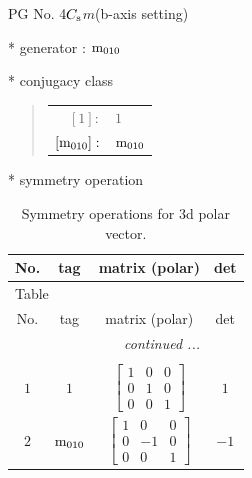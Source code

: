 \documentclass[fleqn,8pt]{jsarticle}
\begin{document}
\setcounter{MaxMatrixCols}{32}

\renewcommand{\tablename}{Table~}
\renewcommand{\figurename}{Figure~}
\begin{center}
\LARGE
PG No. 4\quad$C_{\rm s}$\quad$m$\quad(b-axis setting)\quad[ monoclinic ]
\end{center}

* generator : ${\rm m}_{010}$

* conjugacy class
\begin{quote}
\begin{tabular}{rl}
$ [1]: $ & $ 1 $ \\
$ [{\rm m}_{010}]: $ & $ {\rm m}_{010} $
\end{tabular}
\end{quote}

* symmetry operation
\renewcommand{\arraystretch}{1.3}
\begin{longtable}{cccc}
\caption{Symmetry operations for 3d polar vector.}
 \\
 \hline \hline
No. & tag & matrix (polar) & det \\ \hline \endfirsthead

\multicolumn{3}{l}{\tablename\ \thetable{}} \\
 \hline \hline
No. & tag & matrix (polar) & det \\ \hline \endhead

 \hline \hline
\multicolumn{3}{r}{\footnotesize\it continued ...} \\ \endfoot

 \hline \hline
\multicolumn{3}{r}{} \\ \endlastfoot

$ 1 $ & $ 1 $ & $ \begin{bmatrix} 1 & 0 & 0 \\ 0 & 1 & 0 \\ 0 & 0 & 1 \end{bmatrix} $ & $ 1 $ \\ \hline
$ 2 $ & $ {\rm m}_{010} $ & $ \begin{bmatrix} 1 & 0 & 0 \\ 0 & -1 & 0 \\ 0 & 0 & 1 \end{bmatrix} $ & $ -1 $ \\
\end{longtable}
\end{document}
